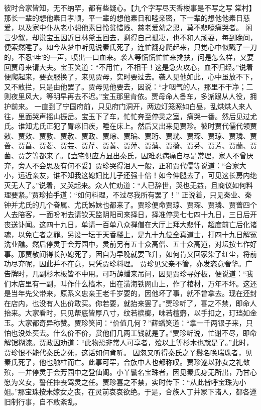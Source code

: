 \documentclass[12pt,oneside]{book}
\begin{document}
彼时合家皆知，无不纳罕，都有些疑心。【九个字写尽天香楼事是不写之写 棠村】那长一辈的想他素日孝顺，平一辈的想他素日和睦亲密，下一辈的想他他素日慈爱，以及家中仆从老小想他素日怜贫惜贱、慈老爱幼之恩，莫不悲嚎痛哭者。
闲言少叙，却说宝玉因近日林黛玉回去，剩得自己孤凄，也不和人顽耍，每到晚间，便索然睡了。如今从梦中听见说秦氏死了，连忙翻身爬起来，只觉心中似戳了一刀的，不忍‘哇’的一声，喷出一口血来。袭人等慌慌忙忙来搀扶，问是怎么样，又要回贾母来请大夫。宝玉笑道：“不用忙，不相干！这是急火攻心，血不归经。”说着便爬起来，要衣服换了，来见贾母，实时要过去。袭人见他如此，心中虽放不下，又不敢拦，只是由他罢了。贾母见他要去，因说：“才咽气的人，那里不干净；二则夜里风大，等明早再去不迟。”宝玉那里肯依。贾母命人备车，多派跟从人役，拥护前来。
一直到了宁国府前，只见府门洞开，两边灯笼照如白昼，乱烘烘人来人往，里面哭声摇山振岳。宝玉下了车，忙忙奔至停灵之室，痛哭一番。然后见过尤氏。谁知尤氏正犯了胃疼旧疾，睡在床上。然后又出来见贾珍。彼时贾代儒代领贾敕、贾效、贾敦、贾赦、贾政、贾琮、贾㻞、贾珩、贾珖、贾琛、贾琼、贾璘、贾蔷、贾菖、贾菱、贾芸、贾芹、贾蓁、贾萍、贾藻、贾蘅、贾芬、贾芳、贾蘭、贾菌、贾芝等都来了。【盍宅俱应方显出秦氏，因难忍病痛自尽是常理，家人不曾厌弃，旁人不会思及有何不妥】贾珍哭得泪人一般，正和贾代儒等说道：“合家大小，远近亲友，谁不知我这媳妇比儿子还强十倍！如今伸腿去了，可见这长房内绝灭无人了。”说着，又哭起来。众人忙劝道：“人已辞世，哭也无益，且商议如何料理要紧。”贾珍拍手道：“如何料理，不过尽我所有罢了！”
正说着，只见秦业、秦钟并尤氏的几个眷属、尤氏姊妹也都来了。贾珍便命贾琼、贾琛、贾璘、贾蔷四个人去陪客，一面吩咐去请钦天监阴阳司来择日，择准停灵七七四十九日，三日后开丧送讣闻。这四十九日，单请一百单八众禅僧在大厅上拜大悲忏，超度前亡后化诸魂，以免亡者之罪。另设一坛于天香楼上，是九十九位全真道士，打四十九日解冤洗业醮。然后停灵于会芳园中，灵前另有五十众高僧、五十众高道，对坛按七作好事。那贾敬闻得长孙媳死了，因自为早晚就要飞升，如何肯又回家染了红尘，将前功尽弃呢，因此并不在意，只凭贾珍料理。
贾珍见父亲不管，亦发恣意奢华。广告牌时，几副杉木板皆不中用。可巧薛蟠来吊问，因见贾珍寻好板，便说道：“我们木店里有一副，叫作什么樯木，出在潢海铁网山上，作了棺材，万年不坏。这还是当年先父带来，原系义忠亲王老千岁要的，因他坏了事，就不曾拿去。现在还封在店内，也没有人出价敢买。你若要，就抬来罢了。”贾珍听了，喜之不禁，即命人抬来。大家看时，只见帮底皆厚八寸，纹若槟榔，味若檀麝，以手扣之，玎珰如金玉。大家都奇异称赞。贾珍笑问：“价值几何？”薛蟠笑道：“拿一千两银子来，只怕也没处买去。什么价不价，赏他们几两工钱就是了。”贾珍听说，忙谢不尽，即命解锯糊漆。贾政因劝道：“此物恐非常人可享者，殓以上等杉木也就是了。”此时，贾珍恨不能代秦氏之死，这话如何肯听。
因忽又听得秦氏之丫鬟名唤瑞珠者，见秦氏死了，他也触柱而亡。此事可罕，合族中人也都称叹。贾珍遂以孙女之礼敛殡，一并停灵于会芳园中之登仙阁。小丫鬟名宝珠者，因见秦氏身无所出，乃甘心愿为义女，誓任摔丧驾灵之任。贾珍喜之不禁，实时传下：“从此皆呼宝珠为小姐。”那宝珠按未嫁女之丧，在灵前哀哀欲绝。于是，合族人丁并家下诸人，都各遵旧制行事，自不敢紊乱。
\end{document}
